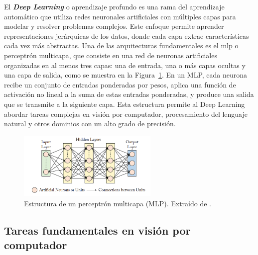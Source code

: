 \documentclass[11pt,spanish,listoffigures,listoftables]{tfgetsinf}
\begin{document}
El \textit{\textbf{Deep Learning}} o aprendizaje profundo es una rama del aprendizaje automático que utiliza redes neuronales artificiales con múltiples capas para modelar y resolver problemas complejos. Este enfoque permite aprender representaciones jerárquicas de los datos, donde cada capa extrae características cada vez más abstractas. Una de las arquitecturas fundamentales es el \gls{mlp} o perceptrón multicapa, que consiste en una red de neuronas artificiales organizadas en al menos tres capas: una de entrada, una o más capas ocultas y una capa de salida, como se muestra en la Figura~\ref{fig:multilayer_perceptron}. En un MLP, cada neurona recibe un conjunto de entradas ponderadas por pesos, aplica una función de activación no lineal a la suma de estas entradas ponderadas, y produce una salida que se transmite a la siguiente capa. Esta estructura permite al Deep Learning abordar tareas complejas en visión por computador, procesamiento del lenguaje natural y otros dominios con un alto grado de precisión.


\begin{figure}[H]
   \centering
   \includegraphics[width=0.6\textwidth]{images/estado_del_arte/multilayer_perceptron.png}
      \caption[Estructura de un perceptrón multicapa (MLP)]{Estructura de un perceptrón multicapa (MLP). Extraído de \cite[fig. 3.1, p.~32]{khan2018guide}.}
   \label{fig:multilayer_perceptron}
\end{figure}

\subsection{Tareas fundamentales en visión por computador} \label{sec:tareas_fundamentales_vision_por_computador}
\end{document}
